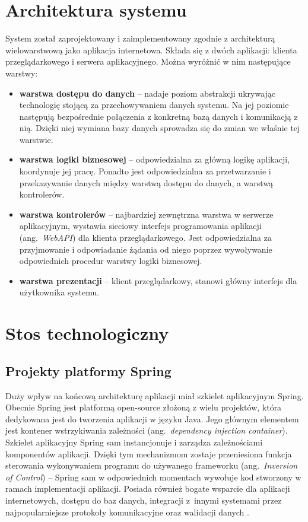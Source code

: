 \section{Architektura systemu}

System został zaprojektowany i zaimplementowany zgodnie z architekturą wielowarstwową jako aplikacja internetowa.
Składa się z dwóch aplikacji: klienta przeglądarkowego i serwera aplikacyjnego.
Można wyróżnić w nim następujące warstwy:
\begin{itemize}
    \item \textbf{warstwa dostępu do danych} -- nadaje poziom abstrakcji ukrywając technologię stojącą za przechowywaniem danych systemu.
    Na jej poziomie następują bezpośrednie połączenia z konkretną bazą danych i komunikacją z nią.
    Dzięki niej wymiana bazy danych sprowadza się do zmian we właśnie tej warstwie.
    \item \textbf{warstwa logiki biznesowej} -- odpowiedzialna za główną logikę aplikacji, koordynuje jej pracę. 
    Ponadto jest odpowiedzialna za przetwarzanie i przekazywanie danych między warstwą dostępu do danych, a warstwą kontrolerów.
    \item \textbf{warstwa kontrolerów} -- najbardziej zewnętrzna warstwa w serwerze aplikacyjnym, wystawia sieciowy interfejs programowania aplikacji (ang.~\textit{WebAPI}) dla klienta przeglądarkowego.
    Jest odpowiedzialna za przyjmowanie i odpowiadanie żądania od niego poprzez wywoływanie odpowiednich procedur warstwy logiki biznesowej.
    \item \textbf{warstwa prezentacji} -- klient przeglądarkowy, stanowi główny interfejs dla użytkownika systemu.
\end{itemize}

\section{Stos technologiczny}

\subsection*{Projekty platformy Spring}

Duży wpływ na końcową architekturę aplikacji miał szkielet aplikacyjnym Spring.
Obecnie Spring jest platformą open-source złożoną z wielu projektów, która dedykowana jest do tworzenia aplikacji w języku Java.
Jego głównym elementem jest kontener wstrzykiwania zależności (ang.~\textit{dependency injection container}).
Szkielet aplikacyjny Spring sam instancjonuje i zarządza zależnościami komponentów aplikacji.
Dzięki tym mechanizmom zostaje przeniesiona funkcja sterowania wykonywaniem programu do używanego frameworku (ang.~\textit{Inversion of Control}) -- Spring sam w odpowiednich momentach wywołuje kod stworzony w ramach implementacji aplikacji.
Posiada również bogate wsparcie dla aplikacji internetowych, dostępu do baz danych, integracji z~innymi systemami przez najpopularniejsze protokoły komunikacyjne oraz walidacji danych \cite{SpringReference}.

